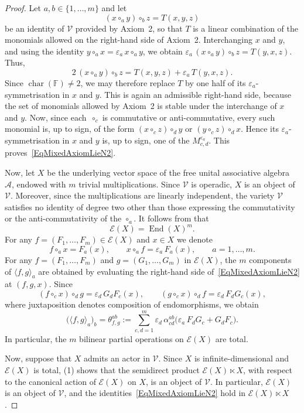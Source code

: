 \documentclass[reqno,a4paper]{amsart}
\theoremstyle{plain}
\theoremstyle{definition}
\theoremstyle{remark}
\numberwithin{equation}{section}
\newcommand{\F}{\mathbb{F}}
\newcommand{\E}{\mathcal{E}}
\newcommand{\V}{\mathcal{V}}
\DeclareMathOperator{\bchar}{char}
\DeclareMathOperator{\End}{End}
\begin{document}
\begin{proof}
Let $a,b\in\{1,\ldots,m\}$ and let
\[
(x\circ_ay)\circ_bz=T(x,y,z)
\]
be an identity of $\V$ provided by Axiom~2, so that $T$ is a linear combination of the monomials allowed on the right-hand side of Axiom~2. Interchanging $x$ and $y$, and using the identity $y\circ_ax=\varepsilon_a\,x\circ_ay$, we obtain $\varepsilon_a\,(x\circ_ay)\circ_bz=T(y,x,z)$. Thus,
\[
2\,(x\circ_ay)\circ_bz=T(x,y,z)+\varepsilon_a\,T(y,x,z).
\]
Since $\bchar(\F)\neq2$, we may therefore replace $T$ by one half of its $\varepsilon_a$-symmetrisation in $x$ and $y$. This is again an admissible right-hand side, because the set of monomials allowed by Axiom~2 is stable under the interchange of $x$ and $y$. Now, since each~$\circ_c$ is commutative or anti-commutative, every such monomial is, up to sign, of the form $(x\circ_cz)\circ_dy$ or $(y\circ_cz)\circ_dx$. Hence its $\varepsilon_a$-symmetrisation in $x$ and $y$ is, up to sign, one of the $M^{\varepsilon_a}_{c,d}$. This proves~\eqref{EqMixedAxiomLieN2}.

Now, let $X$ be the underlying vector space of the free unital associative algebra~$\mathcal{A}$, endowed with $m$ trivial multiplications. Since $\V$ is operadic, $X$ is an object of $\V$. Moreover, since the multiplications are linearly independent, the variety $\V$ satisfies no identity of degree two other than those expressing the commutativity or the anti-commutativity of the $\circ_a$. It follows from  that
\[
\E(X)=\End(X)^m .
\]
For any $f=(F_1,\ldots,F_m)\in\E(X)$ and $x\in X$ we denote
\[
f\circ_ax=F_a(x),
\qquad
x\circ_af=\varepsilon_a\,F_a(x),
\qquad
a=1,\ldots,m .
\]
For any $f=(F_1,\ldots,F_m)$ and $g=(G_1,\ldots,G_m)$ in $\E(X)$, the $m$ components of $\langle f,g\rangle_a$ are obtained by evaluating the right-hand side of~\eqref{EqMixedAxiomLieN2} at $(f,g,x)$. Since
\[
(f\circ_cx)\circ_dg=\varepsilon_d\,G_dF_c(x),
\qquad
(g\circ_cx)\circ_df=\varepsilon_d\,F_dG_c(x),
\]
where juxtaposition denotes composition of endomorphisms, we obtain
\begin{equation}\label{EqPartialOperationSigns}
\bigl(\langle f,g\rangle_a\bigr)_b
=
\theta^{ab}_{f,g}
:=
\sum_{c,d=1}^{m}\varepsilon_d\,\alpha^{ab}_{cd}\bigl(\varepsilon_a\,F_dG_c+G_dF_c\bigr).
\end{equation}
In particular, the $m$ bilinear partial operations on $\E(X)$ are total.

Now, suppose that $X$ admits an actor in $\V$. Since $X$ is infinite-dimensional and~$\E(X)$ is total, (1) shows that the semidirect product $\E(X)\ltimes X$, with respect to the canonical action of $\E(X)$ on $X$, is an object of $\V$. In particular, $\E(X)$ is an object of $\V$, and the identities~\eqref{EqMixedAxiomLieN2} hold in $\E(X)\ltimes X$.


\end{proof}
\end{document}
